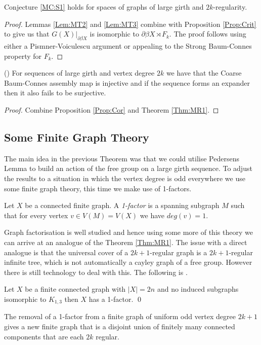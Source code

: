 \begin{conjecture}
\begin{theorem}\label{Thm:MR1}
Conjecture \ref{MC:S1} holds for spaces of graphs of large girth and $2k$-regularity.
\end{theorem}
\begin{proof}
Lemmas \ref{Lem:MT2} and \ref{Lem:MT3} combine with Proposition \ref{Prop:Crit} to give us that $G(X)|_{\partial \beta X}$ is isomorphic to $\partial \beta X \rtimes F_{k}$. The proof follows using either a Pismner-Voiculescu argument or appealing to the Strong Baum-Connes property for $F_{k}$.
\end{proof}

\begin{corollary}(\cite[Theorem 1.5]{explg1})
For sequences of large girth and vertex degree $2k$ we have that the Coarse Baum-Connes assembly map is injective and if the sequence forms an expander then it also fails to be surjective.
\end{corollary}
\begin{proof}
Combine Proposition \ref{Prop:Cor} and Theorem \ref{Thm:MR1}.
\end{proof}

\subsection{Some Finite Graph Theory}
The main idea in the previous Theorem was that we could utilise Pedersens Lemma to build an action of the free group on a large girth sequence. To adjust the results to a situation in which the vertex degree is odd everywhere we use some finite graph theory, this time we make use of 1-factors.

\begin{definition}
Let $X$ be a connected finite graph. A \textit{1-factor} is a spanning subgraph $M$ such that for every vertex $v \in V(M)=V(X)$ we have $deg(v)=1$.
\end{definition}

Graph factorisation is well studied \cite{MR785648} and hence using some more of this theory we can arrive at an analogue of the Theorem \ref{Thm:MR1}. The issue with a direct analogue is that the universal cover of a $2k+1$-regular graph is a $2k+1$-regular infinite tree, which is not automatically a cayley graph of a free group. However there is still technology to deal with this. The following is \cite[Corollary 2]{MR0323648}.

\begin{proposition}
Let $X$ be a finite connected graph with $\vert X \vert = 2n$ and no induced subgraphs isomorphic to $K_{1,3}$ then $X$ has a 1-factor. \qed
\end{proposition}
The removal of a 1-factor from a finite graph of uniform odd vertex degree $2k+1$ gives a new finite graph that is a disjoint union of finitely many connected components that are each $2k$ regular.


\end{conjecture}
